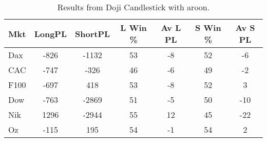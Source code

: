 \begin{table}[ht]
\centering
\caption[Doji Candlestick System with aroon]{Results from Doji Candlestick with aroon.} 
\label{tab:doji_aroon_results}
\begin{tabular}{lcccccc}
  \toprule Mkt & LongPL & ShortPL & L Win \% & Av L PL & S Win \% & Av S PL \\ 
  \midrule Dax & -826 & -1132 & 53 & -8 & 52 & -6 \\ 
  CAC & -747 & -326 & 46 & -6 & 49 & -2 \\ 
  F100 & -697 & 418 & 53 & -8 & 52 & 3 \\ 
  Dow & -763 & -2869 & 51 & -5 & 50 & -10 \\ 
  Nik & 1296 & -2944 & 55 & 12 & 45 & -22 \\ 
  Oz & -115 & 195 & 54 & -1 & 54 & 2 \\ 
   \bottomrule \end{tabular}
\end{table}

